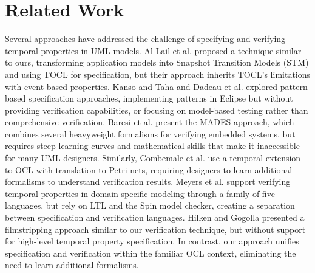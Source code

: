 \section{Related Work}
Several approaches have addressed the challenge of specifying and verifying temporal properties in UML models. Al Lail et al. \cite{TPV} proposed a technique similar to ours, transforming application models into Snapshot Transition Models (STM) and using TOCL for specification, but their approach inherits TOCL's limitations with event-based properties. Kanso and Taha \cite{TOCL_Taha} and Dadeau et al. \cite{verification_TOCL_Taha} explored pattern-based specification approaches, implementing patterns in Eclipse but without providing verification capabilities, or focusing on model-based testing rather than comprehensive verification. Baresi et al. \cite{MADES} present the MADES approach, which combines several heavyweight formalisms for verifying embedded systems, but requires steep learning curves and mathematical skills that make it inaccessible for many UML designers. Similarly, Combemale et al. \cite{Combemale_related_work_2} use a temporal extension to OCL with translation to Petri nets, requiring designers to learn additional formalisms to understand verification results. Meyers et al. \cite{ProMoBox_related_work_3} support verifying temporal properties in domain-specific modeling through a family of five languages, but rely on LTL and the Spin model checker, creating a separation between specification and verification languages. Hilken and Gogolla \cite{verifying_filmstripping} presented a filmstripping approach similar to our verification technique, but without support for high-level temporal property specification. In contrast, our approach unifies specification and verification within the familiar OCL context, eliminating the need to learn additional formalisms.


